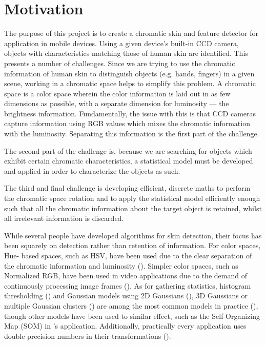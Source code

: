 
\chapter{Motivation}  %

\ifpdf
    \graphicspath{{Chapter1/Figs/Raster/}{Chapter1/Figs/PDF/}{Chapter1/Figs/}}
\else
    \graphicspath{{Chapter1/Figs/Vector/}{Chapter1/Figs/}}
\fi

The purpose of this project is to create a chromatic skin and feature detector for application in mobile devices. Using a given device's built-in CCD camera, objects with characteristics matching those of human skin are identified. This presents a number of challenges. Since we are trying to use the chromatic information of human skin to distinguish objects (e.g. hands, fingers) in a given scene, working in a chromatic space helps to simplify this problem. A chromatic space is a color space wherein the color information is laid out in as few dimensions as possible, with a separate dimension for luminosity --- the brightness information. Fundamentally, the issue with this is that CCD cameras capture information using RGB values which mixes the chromatic information with the luminosity. Separating this information is the first part of the challenge.

The second part of the challenge is, because we are searching for objects which exhibit certain chromatic characteristics, a statistical model must be developed and applied in order to characterize the objects as such.

The third and final challenge is developing efficient, discrete maths to perform the chromatic space rotation and to apply the statistical model efficiently enough such that all the chromatic information about the target object is retained, whilst all irrelevant information is discarded.

While several people have developed algorithms for skin detection, their focus has been squarely on detection rather than retention of information. For color spaces, Hue- based spaces, such as HSV, have been used due to the clear separation of the chromatic information and luminosity (\cite{Zarit1999a,Sigal2000a}). Simpler color spaces, such as Normalized RGB, have been used in video applications due to the demand of continuously processing image frames (\cite{Soriano2000a}). As for gathering statistics, histogram thresholding (\cite{Soriano2000a,Sigal2000a}) and Gaussian models using 2D Gaussians (\cite{Terrillon1999a}), 3D Gaussians or multiple Gaussian clusters (\cite{Vezhnevets2003}) are among the most common models in practice (\cite{Shin2002a}), though other models have been used to similar effect, such as the Self-Organizing Map (SOM) in \cite{Brown2001a}'s application. Additionally, practically every application uses double precision numbers in their transformations (\cite{Shin2002a,Vezhnevets2003,Terrillon1999a}).

